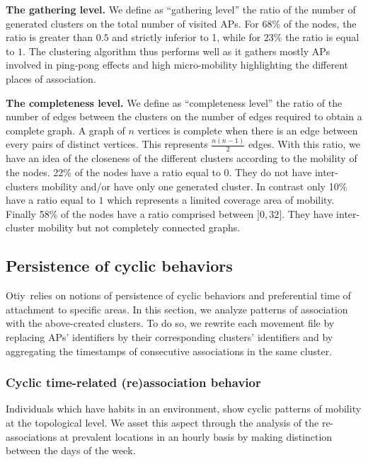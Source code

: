 \documentclass[a4paper]{sig-alternate-10pt}
\newcommand{\otiy}{{\sffamily Otiy}}
\begin{document}
\noindent \textbf{The gathering level.} We define as ``gathering
level'' the ratio of the number of generated clusters on the total
number of visited APs. For 68\% of the nodes, the ratio is
greater than $0.5$ and strictly inferior to 1, while for 23\% the
ratio is equal to $1$. The clustering algorithm thus performs well
as it gathers mostly APs involved in ping-pong effects and high
micro-mobility highlighting the different places of association.\vspace{2mm}

\noindent \textbf{The completeness level.} We define as
``completeness level'' the ratio of the number of edges between the
clusters on the number of edges required to obtain a complete graph.
A graph of $n$ vertices is complete when there is an edge between
every pairs of distinct vertices. This represents $\frac{n(n-1)}{2}$
edges. With this ratio, we have an idea of the closeness of the
different clusters according to the mobility of the nodes.
22\% of the nodes have a ratio equal to $0$. They do not have
inter-clusters mobility and/or have only one generated cluster. In
contrast only 10\% have a ratio equal to $1$ which represents a
limited coverage area of mobility. Finally 58\% of the nodes
have a ratio comprised between $]0,32]$. They have inter-cluster
mobility but not completely connected graphs.


\subsection{Persistence of cyclic behaviors}
\label{sec:cyclic}

\otiy\ relies on notions of persistence of cyclic behaviors and
preferential time of attachment to specific areas. In this section,
we analyze patterns of association with the above-created clusters.
To do so, we rewrite each movement file by replacing APs'
identifiers by their cor\-responding clusters' identifiers and by
aggregating the timestamps of consecutive associations in the same
cluster.

\subsubsection{Cyclic time-related (re)association behavior}
\label{sssec:cyclic_t_ass}

Individuals which have habits in an environment, show cyclic
patterns of mobility at the topological level. We asset this aspect
through the analysis of the re-associations at prevalent locations
in an hourly basis by making distinction between the days of the
week.
\end{document}
